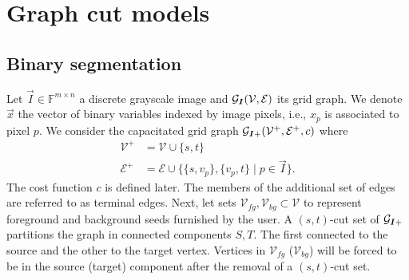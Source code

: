 \section{Graph cut models}
\label{ch2:sec:graph-cut-models}


\subsection{Binary segmentation}

Let $\vec{I} \in \mathbb{F}^{m\times n}$ a discrete grayscale image and $\mathcal{G}_{\bm{I}} (\mathcal{V},\mathcal{E})$ its grid graph. We denote $\vec{x}$ the vector of binary variables indexed by image pixels, i.e., $x_p$ is associated to pixel $p$. We consider the capacitated grid graph $\mathcal{G}_{\bm{I}+} (\mathcal{V}^+,\mathcal{E}^+,c)$ where 
\begin{align*}
	\mathcal{V}^+ &= \mathcal{V} \cup \{s,t\} \\
	\mathcal{E}^+ &= \mathcal{E} \cup \big\{ \{s,v_p\}, \{v_p,t\} \; | \; p \in \vec{I} \big\}.
\end{align*}
The cost function $c$ is defined later. The members of the additional set of edges are referred to as terminal edges. Next, let sets $\mathcal{V}_{fg}, \mathcal{V}_{bg} \subset \mathcal{V}$ to represent foreground and background seeds furnished by the user. A $(s,t)$-cut set of $\mathcal{G}_{\bm{I}+}$ partitions the graph in connected components $S,T$. The first connected to the source and the other to the target vertex. Vertices in $\mathcal{V}_{fg}$ ($\mathcal{V}_{bg}$) will be forced to be in the source (target) component after the removal of a $(s,t)$-cut set.

